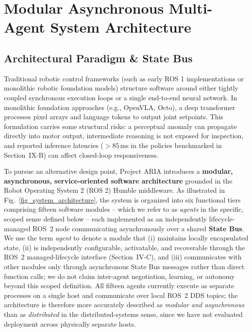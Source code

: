 \documentclass[journal]{IEEEtran}
\begin{document}
\section{Modular Asynchronous Multi-Agent System Architecture}

\subsection{Architectural Paradigm \& State Bus}
Traditional robotic control frameworks (such as early ROS 1 implementations or monolithic robotic foundation models) structure software around either tightly coupled synchronous execution loops or a single end-to-end neural network. In monolithic foundation approaches (e.g., OpenVLA, Octo), a deep transformer processes pixel arrays and language tokens to output joint setpoints. This formulation carries some structural risks: a perceptual anomaly can propagate directly into motor output, intermediate reasoning is not exposed for inspection, and reported inference latencies ($>85$\,ms in the policies benchmarked in Section~IX-B) can affect closed-loop responsiveness.

To pursue an alternative design point, Project ARIA introduces a \textbf{modular, asynchronous, service-oriented software architecture} grounded in the Robot Operating System 2 (ROS 2) Humble middleware. As illustrated in Fig.~\ref{fig_system_architecture}, the system is organized into six functional tiers comprising fifteen software modules -- which we refer to as \emph{agents} in the specific, scoped sense defined below -- each implemented as an independently lifecycle-managed ROS~2 node communicating asynchronously over a shared \textbf{State Bus}. We use the term \emph{agent} to denote a module that (i) maintains locally encapsulated state, (ii) is independently configurable, activatable, and recoverable through the ROS~2 managed-lifecycle interface (Section~IV-C), and (iii) communicates with other modules only through asynchronous State Bus messages rather than direct function calls; we do not claim inter-agent negotiation, learning, or autonomy beyond this scoped definition. All fifteen agents currently execute as separate processes on a single host and communicate over local ROS~2 DDS topics; the architecture is therefore more accurately described as \emph{modular and asynchronous} than as \emph{distributed} in the distributed-systems sense, since we have not evaluated deployment across physically separate hosts.
\end{document}
